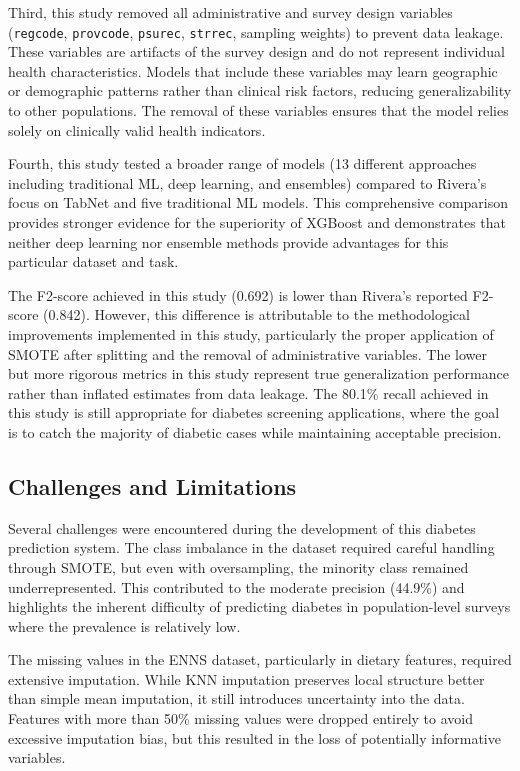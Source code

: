 Third, this study removed all administrative and survey design variables (\texttt{regcode}, \texttt{provcode}, \texttt{psurec}, \texttt{strrec}, sampling weights) to prevent data leakage. These variables are artifacts of the survey design and do not represent individual health characteristics. Models that include these variables may learn geographic or demographic patterns rather than clinical risk factors, reducing generalizability to other populations. The removal of these variables ensures that the model relies solely on clinically valid health indicators.

Fourth, this study tested a broader range of models (13 different approaches including traditional ML, deep learning, and ensembles) compared to Rivera's focus on TabNet and five traditional ML models. This comprehensive comparison provides stronger evidence for the superiority of XGBoost and demonstrates that neither deep learning nor ensemble methods provide advantages for this particular dataset and task.

The F2-score achieved in this study (0.692) is lower than Rivera's reported F2-score (0.842). However, this difference is attributable to the methodological improvements implemented in this study, particularly the proper application of SMOTE after splitting and the removal of administrative variables. The lower but more rigorous metrics in this study represent true generalization performance rather than inflated estimates from data leakage. The 80.1\% recall achieved in this study is still appropriate for diabetes screening applications, where the goal is to catch the majority of diabetic cases while maintaining acceptable precision.

\subsection{Challenges and Limitations}

Several challenges were encountered during the development of this diabetes prediction system. The class imbalance in the dataset required careful handling through SMOTE, but even with oversampling, the minority class remained underrepresented. This contributed to the moderate precision (44.9\%) and highlights the inherent difficulty of predicting diabetes in population-level surveys where the prevalence is relatively low.

The missing values in the ENNS dataset, particularly in dietary features, required extensive imputation. While KNN imputation preserves local structure better than simple mean imputation, it still introduces uncertainty into the data. Features with more than 50\% missing values were dropped entirely to avoid excessive imputation bias, but this resulted in the loss of potentially informative variables.

